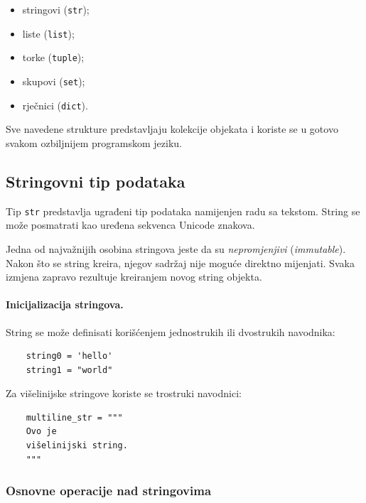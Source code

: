 \begin{itemize}
	\item stringovi (\texttt{str});
	\item liste (\texttt{list});
	\item torke (\texttt{tuple});
	\item skupovi (\texttt{set});
	\item rječnici (\texttt{dict}).
\end{itemize}

Sve navedene strukture predstavljaju kolekcije objekata i koriste se u gotovo svakom ozbiljnijem programskom jeziku.

\subsection{Stringovni tip podataka}

Tip \texttt{str} predstavlja ugrađeni tip podataka namijenjen radu sa tekstom. String se može posmatrati kao uređena sekvenca Unicode znakova.

Jedna od najvažnijih osobina stringova jeste da su \textit{nepromjenjivi} (\textit{immutable}). Nakon što se string kreira, njegov sadržaj nije moguće direktno mijenjati. Svaka izmjena zapravo rezultuje kreiranjem novog string objekta.

\paragraph{Inicijalizacija stringova.}  String se može definisati korišćenjem jednostrukih ili dvostrukih navodnika:

\begin{verbatim}
	string0 = 'hello'
	string1 = "world"
\end{verbatim}

Za višelinijske stringove koriste se trostruki navodnici:

\begin{verbatim}
	multiline_str = """
	Ovo je
	višelinijski string.
	"""
\end{verbatim}

\subsubsection*{Osnovne operacije nad stringovima}

